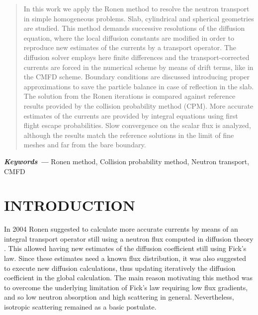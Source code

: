 \documentclass{ictt26}
\providecommand{\keywords}[1]{\textbf{\textit{Keywords ---}} #1}
\begin{document}
\begin{abstract}
In this work we apply the Ronen method to resolve the neutron transport in simple homogeneous problems. Slab, cylindrical and spherical geometries are studied. This method demands successive resolutions of the diffusion equation, where the local diffusion constants are modified in order to reproduce new estimates of the currents by a transport operator. The diffusion solver employs here finite differences and the transport-corrected currents are forced in the numerical scheme by means of drift terms, like in the CMFD scheme. Boundary conditions are discussed introducing proper approximations to save the particle balance in case of reflection in the slab. The solution from the Ronen iterations is compared against reference results provided by the collision probability method (CPM). More accurate estimates of the currents are provided by integral equations using first flight escape probabilities. Slow convergence on the scalar flux is analyzed, although the results match the reference solutions in the limit of fine meshes and far from the bare boundary.
%
\end{abstract}
%
\keywords{Ronen method, Collision probability method, Neutron transport, CMFD}
\clearpage
\tableofcontents
\clearpage
%
%
\raggedright

\linenumbers

\section{INTRODUCTION}
\label{sec:intro}

In 2004 Ronen suggested to calculate more accurate currents by means of an integral transport operator still using a neutron flux computed in diffusion theory \cite{ronen2004accurate}. This allowed having new estimates of the diffusion coefficient still using Fick's law. Since these estimates need a known flux distribution, it was also suggested to execute new diffusion calculations, thus updating iteratively the diffusion coefficient in the global calculation. The main reason motivating this method was to overcome the underlying limitation of Fick's law requiring low flux gradients, and so low neutron absorption and high scattering in general. Nevertheless, isotropic scattering remained as a basic postulate.
\end{document}
